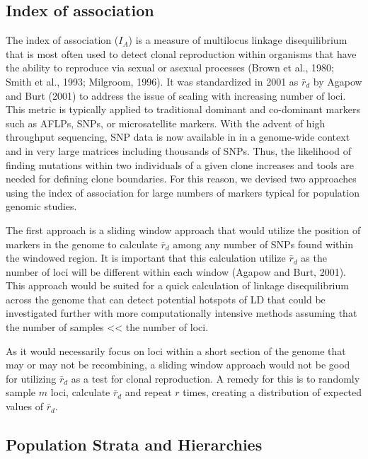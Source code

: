 \documentclass{frontiersSCNS} %
\begin{document}
\subsection*{Index of association}\label{index-of-association}

The index of association (\(I_A\)) is a measure of multilocus linkage
disequilibrium that is most often used to detect clonal reproduction
within organisms that have the ability to reproduce via sexual or
asexual processes (Brown et al., 1980; Smith et al., 1993; Milgroom,
1996). It was standardized in 2001 as \(\bar{r}_d\) by Agapow and Burt
(2001) to address the issue of scaling with increasing number of loci.
This metric is typically applied to traditional dominant and co-dominant
markers such as AFLPs, SNPs, or microsatellite markers. With the advent
of high throughput sequencing, SNP data is now available in in a
genome-wide context and in very large matrices including thousands of
SNPs. Thus, the likelihood of finding mutations within two individuals
of a given clone increases and tools are needed for defining clone
boundaries. For this reason, we devised two approaches using the index
of association for large numbers of markers typical for population
genomic studies.

The first approach is a sliding window approach that would utilize the
position of markers in the genome to calculate \(\bar{r}_d\) among any
number of SNPs found within the windowed region. It is important that
this calculation utilize \(\bar{r}_d\) as the number of loci will be
different within each window (Agapow and Burt, 2001). This approach
would be suited for a quick calculation of linkage disequilibrium across
the genome that can detect potential hotspots of LD that could be
investigated further with more computationally intensive methods
assuming that the number of samples \textless{}\textless{} the number of
loci.

As it would necessarily focus on loci within a short section of the
genome that may or may not be recombining, a sliding window approach
would not be good for utilizing \(\bar{r}_d\) as a test for clonal
reproduction. A remedy for this is to randomly sample \(m\) loci,
calculate \(\bar{r}_d\) and repeat \(r\) times, creating a distribution
of expected values of \(\bar{r}_d\).

\subsection*{Population Strata and
Hierarchies}\label{population-strata-and-hierarchies}
\end{document}
